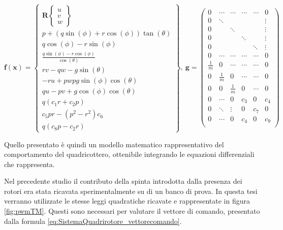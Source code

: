 \begin{equation}\label{eq:SistemaQuadrirotore_statespaceElement}
	\mathbf{f(x)} = \begin{Bmatrix}
		\mathbf{R} \begin{Bmatrix}
			u \\ v \\ w
		\end{Bmatrix} \\
		p + (q\sin(\phi)+r\cos(\phi))\tan(\theta) \\
		q\cos(\phi) - r\sin(\phi) \\
		\frac{q\sin(\phi) - r\cos(\phi)}{\cos(\theta)}\\
		rv-qw-g\sin(\theta)\\
		-ru + pw p g \sin(\phi)\cos(\theta)\\
		qu - pv + g \cos(\phi)\cos(\theta)\\
		q (c_1 r + c_2 p)\\
		c_5 pr - (p^2-r^2) c_6 \\
		q(c_8 p - c_2 r)
	\end{Bmatrix}, \ \mathbf{g} =
	\begin{pmatrix}
		0 & \cdots & \cdots & \cdots & \cdots & 0 \\
		0 & \ddots & & & & \vdots \\
		0 & & \ddots & & & \vdots \\
		0 & & & \ddots & & \vdots \\
		0 & & & & \ddots & \vdots \\
		0 & \cdots & \cdots & \cdots & \cdots & 0 \\
		\frac{1}{m} & 0 & \cdots & \cdots & \cdots & 0 \\
		0 & \frac{1}{m} & 0 & \cdots & \cdots & 0 \\
		0 & 0 & \frac{1}{m} & 0 & \cdots & 0 \\
		0 & \cdots & 0 & c_3 & 0 & c_4 \\
		0 & \ddots & \vdots & 0 & c_7 & 0 \\
		0 & \cdots & 0 & c_4 & 0 & c_9 \\
	\end{pmatrix}
\end{equation}

Quello presentato è quindi un modello matematico rappresentativo del comportamento del quadricottero, ottenibile integrando le equazioni differenziali che rappresenta.

Nel precedente studio il contributo della spinta introdotta dalla presenza dei rotori era stata ricavata sperimentalmente su di un banco di prova. In questa tesi verranno utilizzate le stesse leggi quadratiche ricavate e rappresentate in figura \ref{fig:pwmTM}. Questi sono necessari per valutare il vettore di comando, presentato dalla formula \ref{eq:SistemaQuadrirotore_vettorecomando}.

